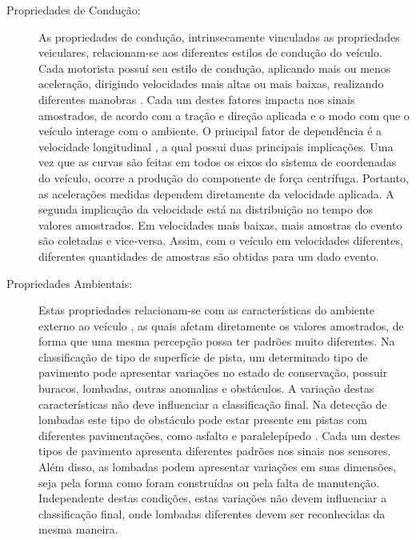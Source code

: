 \begin{description}
	\item [Propriedades de Condução:] 
	
	As propriedades de condução, intrinsecamente vinculadas as propriedades veiculares, relacionam-se aos diferentes estilos de condução do veículo.  Cada motorista possuí seu estilo de condução, aplicando mais ou menos aceleração, dirigindo velocidades mais altas ou mais baixas, realizando diferentes manobras \cite{Alam2020}. Cada um destes fatores impacta nos sinais amostrados, de acordo com a tração e direção aplicada e o modo com que o veículo interage com o ambiente. O principal fator de dependência é a velocidade longitudinal \cite{Brunauer2016,Douangphachanh2013,Gueta2017,Kumar2017,Lima2016,M.2017,Nalavde2015,Singh2017,Alam2020}, a qual possui duas principais implicações. Uma vez que as curvas são feitas em todos os eixos do sistema de coordenadas do veículo, ocorre a produção do componente de força centrífuga. Portanto, as acelerações medidas dependem diretamente da velocidade aplicada. A segunda implicação da velocidade está na distribuição no tempo dos valores amostrados. Em velocidades mais baixas, mais amostras do evento são coletadas e vice-versa. Assim, com o veículo em velocidades diferentes, diferentes quantidades de amostras são obtidas para um dado evento.

	\item [Propriedades Ambientais:] 
	
	Estas propriedades relacionam-se com as características do ambiente externo ao veículo \cite{Alam2020}, as quais afetam diretamente os valores amostrados, de forma que uma mesma percepção possa ter padrões muito diferentes. Na classificação de tipo de superfície de pista, um determinado tipo de pavimento pode apresentar variações no estado de conservação, possuir buracos, lombadas, outras anomalias e obstáculos. A variação destas características não deve influenciar a classificação final. Na detecção de lombadas este tipo de obstáculo pode estar presente em pistas com diferentes pavimentações, como asfalto e paralelepípedo \cite{Masino2017}. Cada um destes tipos de pavimento apresenta diferentes padrões nos sinais nos sensores. Além disso, as lombadas podem apresentar variações em suas dimensões, seja pela forma como foram construídas ou pela falta de manutenção. Independente destas condições, estas variações não devem influenciar a classificação final, onde lombadas diferentes devem ser reconhecidas da mesma maneira.
	 
\end{description}

